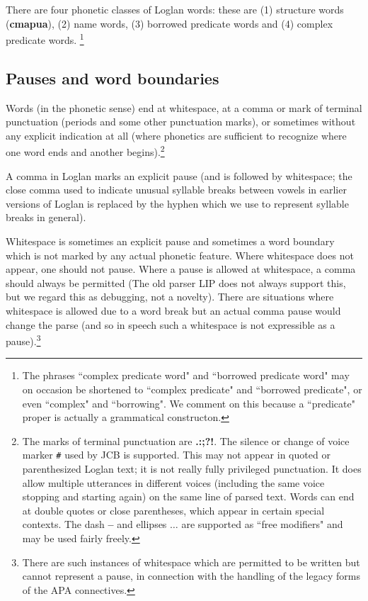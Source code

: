 \documentclass[12pt]{book}
\begin{document}
There are four phonetic classes of Loglan words:  these are (1) structure words ({\bf cmapua}), (2) name words, (3) borrowed predicate words and (4) complex predicate words.  \footnote{The phrases ``complex predicate word" and ``borrowed predicate word" may on occasion be shortened to ``complex predicate"
and ``borrowed predicate", or even ``complex" and ``borrowing".  We comment on this because a ``predicate" proper is actually a grammatical constructon.}

\subsection{Pauses and word boundaries}

Words (in the phonetic sense) end at whitespace, at a comma or mark of terminal punctuation (periods and some other punctuation marks), or sometimes without any explicit indication at all (where phonetics are sufficient to recognize where one word ends and another begins).\footnote{The marks of terminal punctuation are {\bf .:;?!}.  
The silence or change of voice marker {\tt \#} used by JCB is supported.   This may not appear in quoted or parenthesized Loglan text; it is not really fully privileged punctuation.  It does allow multiple utterances in different voices (including the same voice stopping and starting again) on the same line of parsed text.  Words can end at double quotes or close parentheses, which appear in certain special contexts.  The dash {\bf --} and ellipses $\ldots$ are supported as ``free modifiers" and may be used fairly freely.}

A comma in Loglan marks an explicit pause (and is followed by whitespace;  the close comma used to indicate unusual syllable breaks between vowels in earlier versions of Loglan is replaced by the hyphen which we use to represent syllable breaks in general).

Whitespace is sometimes an explicit pause and sometimes a word boundary which is not marked by any actual phonetic feature.  Where whitespace does not appear, one should not pause.  Where a pause is allowed at whitespace, a comma should always be permitted (The old parser LIP does not always support this, but we regard this as debugging, not a novelty).   There are situations where whitespace is allowed due to a word break but an actual comma pause would change the parse (and so in speech such a whitespace is not expressible as a pause).\footnote{There are such instances of whitespace which are permitted to be written but cannot represent a pause, in connection with the handling of the legacy forms of the APA connectives.}
\end{document}
